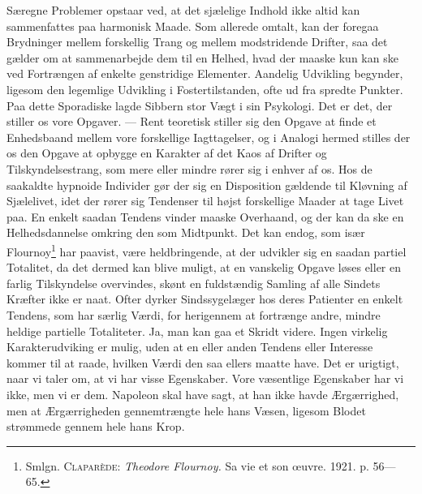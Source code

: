 \documentclass[12pt]{article}
\newcommand{\opage}[1]{\marginnote{\footnotesize\textit{[#1]}}}
\begin{document}
Særegne Problemer opstaar ved, at det sjælelige Indhold ikke altid kan
sammenfattes paa harmonisk Maade. Som allerede omtalt, kan der foregaa
Brydninger mellem forskellig Trang og mellem modstridende Drifter, saa
det gælder om at sammenarbejde dem til en Helhed, hvad der maaske kun
kan ske ved Fortrængen af enkelte genstridige Elementer. Aandelig
Udvikling begynder, ligesom den legemlige Udvikling i
Fostertilstanden, ofte ud fra spredte Punkter. Paa dette Sporadiske
lagde Sibbern stor Vægt i sin Psykologi. Det er det, der stiller os
vore Opgaver. --- Rent teoretisk stiller sig den Opgave at finde et
Enhedsbaand mellem vore forskellige Iagttagelser, og i Analogi hermed
stilles der os den Opgave at opbygge en Karakter af det Kaos af
Drifter og Tilskyndelsestrang, som mere eller mindre rører sig i
enhver af os. Hos de saakaldte hypnoide Individer
\setcounter{footnote}{0}%
\opage{37}gør der sig en Disposition gældende til Kløvning af Sjælelivet,
idet der rører sig Tendenser til højst forskellige Maader at tage
Livet paa. En enkelt saadan Tendens vinder maaske Overhaand, og der kan
da ske en Helhedsdannelse omkring den som Midtpunkt. Det kan endog,
som især Flournoy\footnote{Smlgn. \textsc{Claparède}: \textit{Theodore
Flournoy.} Sa vie et son œuvre. 1921. p. 56---65.} har paavist, være
heldbringende, at der udvikler sig en saadan partiel Totalitet, da det
dermed kan blive muligt, at en vanskelig Opgave løses eller en farlig
Tilskyndelse overvindes, skønt en fuldstændig Samling af alle Sindets
Kræfter ikke er naat. Ofter dyrker Sindssygelæger hos deres Patienter
en enkelt Tendens, som har særlig Værdi, for herigennem at fortrænge
andre, mindre heldige partielle Totaliteter. Ja, man kan gaa et Skridt
videre. Ingen virkelig Karakterudviking er mulig, uden at en eller
anden Tendens eller Interesse kommer til at raade, hvilken Værdi den
saa ellers maatte have. Det er urigtigt, naar vi taler om, at vi
\guillemotright{}har\guillemotleft{} visse Egenskaber. Vore væsentlige Egenskaber \guillemotright{}har\guillemotleft{} vi
ikke, men vi \guillemotright{}er\guillemotleft{} dem. Napoleon skal have sagt, at han ikke
\guillemotright{}havde\guillemotleft{} Ærgærrighed, men at Ærgærrigheden gennemtrængte hele hans
Væsen, ligesom Blodet strømmede gennem hele hans Krop.
\end{document}
